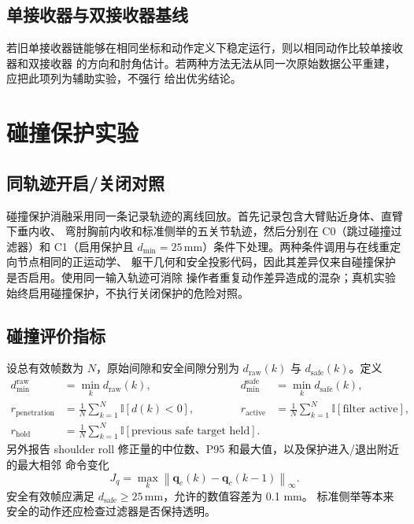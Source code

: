 \subsection{单接收器与双接收器基线}
\label{subsec:ch6_single_dual_baseline}

若旧单接收器链能够在相同坐标和动作定义下稳定运行，则以相同动作比较单接收器和双接收器
的方向和肘角估计。若两种方法无法从同一次原始数据公平重建，应把此项列为辅助实验，不强行
给出优劣结论。

\section{碰撞保护实验}
\label{sec:ch6_collision_experiment}

\subsection{同轨迹开启/关闭对照}
\label{subsec:ch6_collision_ablation}

碰撞保护消融采用同一条记录轨迹的离线回放。首先记录包含大臂贴近身体、直臂下垂内收、
弯肘胸前内收和标准侧举的五关节轨迹，然后分别在 C0（跳过碰撞过滤器）和 C1（启用保护且
$d_{\min}=25\,\mathrm{mm}$）条件下处理。两种条件调用与在线重定向节点相同的正运动学、
躯干几何和安全投影代码，因此其差异仅来自碰撞保护是否启用。使用同一输入轨迹可消除
操作者重复动作差异造成的混杂；真机实验始终启用碰撞保护，不执行关闭保护的危险对照。

\subsection{碰撞评价指标}
\label{subsec:ch6_collision_metrics}

设总有效帧数为 $N$，原始间隙和安全间隙分别为 $d_{\mathrm{raw}}(k)$ 与
$d_{\mathrm{safe}}(k)$。定义
\begin{align}
  d_{\min}^{\mathrm{raw}}&=\min_k d_{\mathrm{raw}}(k),
  &d_{\min}^{\mathrm{safe}}&=\min_k d_{\mathrm{safe}}(k),
  \label{eq:ch6_min_clearances}\\
  r_{\mathrm{penetration}}
  &=\frac{1}{N}\sum_{k=1}^{N}\mathbb{I}[d(k)<0],
  &r_{\mathrm{active}}
  &=\frac{1}{N}\sum_{k=1}^{N}
  \mathbb{I}[\text{filter active}],
  \label{eq:ch6_collision_rates}\\
  r_{\mathrm{hold}}
  &=\frac{1}{N}\sum_{k=1}^{N}
  \mathbb{I}[\text{previous safe target held}].
  \label{eq:ch6_collision_hold_rate}
\end{align}
另外报告 shoulder roll 修正量的中位数、P95 和最大值，以及保护进入/退出附近的最大相邻
命令变化
\begin{equation}
  J_q=\max_k
  \left\|\boldsymbol q_c(k)-\boldsymbol q_c(k-1)\right\|_\infty.
  \label{eq:ch6_collision_command_jump}
\end{equation}
安全有效帧应满足 $d_{\mathrm{safe}}\ge25\,\mathrm{mm}$，允许的数值容差为 0.1 mm。
标准侧举等本来安全的动作还应检查过滤器是否保持透明。

